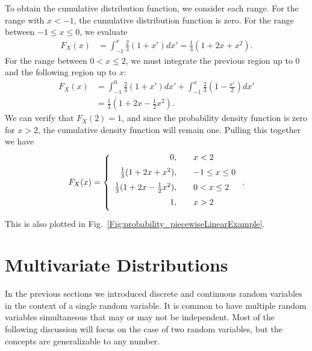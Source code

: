 To obtain the cumulative distribution function, we consider each range. For the range with $x < -1$, the cumulative distribution function is zero. For the range between $-1 \le x \le 0$, we evaluate
\begin{align}
  F_X(x) &= \int_{-1}^x \tfrac{2}{3} ( 1 + x' ) dx' = \frac{1}{3} ( 1 + 2 x + x^2 ) .
\end{align}
For the range between $0 < x \le 2$, we must integrate the previous region up to 0 and the following region up to $x$:
\begin{align}
  F_X(x) &= \int_{-1}^0 \tfrac{2}{3} ( 1 + x' ) dx' + \int_{-1}^x \tfrac{2}{3} ( 1 - \tfrac{x'}{2} ) dx' \nonumber \\
  &= \tfrac{1}{3} ( 1 + 2 x - \tfrac{1}{2} x^2 ) .
\end{align}
We can verify that $F_X(2) = 1$, and since the probability density function is zero for $x > 2$, the cumulative density function will remain one. Pulling this together we have
\begin{align}
  F_X(x) = \left\{ \begin{array}{r l}
    0, & \quad x < 2  \vspace{0.2cm} \\
    \frac{1}{3} ( 1 + 2 x + x^2 ),            & \quad -1 \le x \le 0 \vspace{0.2cm} \\
    \tfrac{1}{3} ( 1 + 2 x - \tfrac{1}{2} x^2 ), & \quad  0 < x \le 2 \vspace{0.2cm} \\
    1, & \quad x > 2 \vspace{0.2cm} \\ \end{array} \right. .
\end{align}
This is also plotted in Fig.~\ref{Fig:probability_piecewiseLinearExample}.


\section{Multivariate Distributions}

In the previous sections we introduced discrete and continuous random variables in the context of a single random variable. It is common to have multiple random variables simultaneous that may or may not be independent. Most of the following discussion will focus on the case of two random variables, but the concepts are generalizable to any number.

